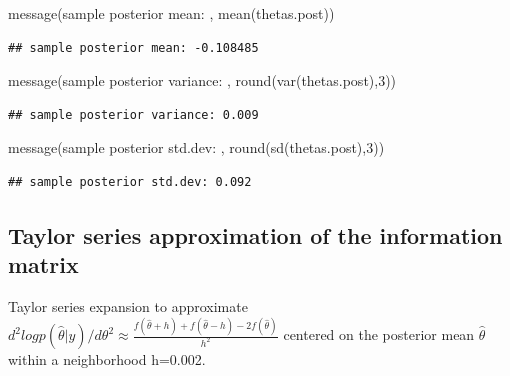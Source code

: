 \documentclass[
]{book}
\newenvironment{Shaded}{\begin{snugshade}}{\end{snugshade}}
\newcommand{\DecValTok}[1]{\textcolor[rgb]{0.00,0.00,0.81}{#1}}
\newcommand{\FunctionTok}[1]{\textcolor[rgb]{0.00,0.00,0.00}{#1}}
\newcommand{\NormalTok}[1]{#1}
\newcommand{\StringTok}[1]{\textcolor[rgb]{0.31,0.60,0.02}{#1}}
\theoremstyle{definition}
\theoremstyle{definition}
\theoremstyle{definition}
\theoremstyle{definition}
\theoremstyle{remark}
\begin{document}
\begin{Shaded}
\begin{Highlighting}[]
 \FunctionTok{message}\NormalTok{(}\StringTok{\textquotesingle{}sample posterior mean: \textquotesingle{}}\NormalTok{, }\FunctionTok{mean}\NormalTok{(thetas.post))}
\end{Highlighting}
\end{Shaded}

\begin{verbatim}
## sample posterior mean: -0.108485
\end{verbatim}

\begin{Shaded}
\begin{Highlighting}[]
 \FunctionTok{message}\NormalTok{(}\StringTok{\textquotesingle{}sample posterior variance: \textquotesingle{}}\NormalTok{, }\FunctionTok{round}\NormalTok{(}\FunctionTok{var}\NormalTok{(thetas.post),}\DecValTok{3}\NormalTok{))}
\end{Highlighting}
\end{Shaded}

\begin{verbatim}
## sample posterior variance: 0.009
\end{verbatim}

\begin{Shaded}
\begin{Highlighting}[]
 \FunctionTok{message}\NormalTok{(}\StringTok{\textquotesingle{}sample posterior std.dev: \textquotesingle{}}\NormalTok{, }\FunctionTok{round}\NormalTok{(}\FunctionTok{sd}\NormalTok{(thetas.post),}\DecValTok{3}\NormalTok{))}
\end{Highlighting}
\end{Shaded}

\begin{verbatim}
## sample posterior std.dev: 0.092
\end{verbatim}

\hypertarget{taylor-series-approximation-of-the-information-matrix}{%
\subsection{Taylor series approximation of the information matrix}\label{taylor-series-approximation-of-the-information-matrix}}

Taylor series expansion to approximate \(d^2log p(\hat{\theta}|y)/d\theta^2 \approx \frac{f(\hat{\theta}+h)+f(\hat{\theta}-h)-2f(\hat{\theta})}{h^2}\) centered on the posterior mean \(\hat{\theta}\) within a neighborhood h=0.002.
\end{document}
